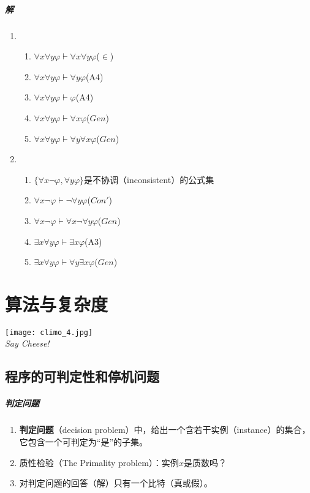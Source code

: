 \documentclass[b5paper,oneside]{ctexbook}
\begin{document}
\paragraph{解}
\begin{enumerate}
\item \begin{enumerate}
\item $\forall x\forall y\varphi\vdash\forall x\forall y\varphi$\hfill ($\in$)
\item $\forall x\forall y\varphi\vdash\forall y\varphi$\hfill (A4)
\item $\forall x\forall y\varphi\vdash\varphi$\hfill (A4)
\item $\forall x\forall y\varphi\vdash\forall x\varphi$\hfill ($Gen$)
\item $\forall x\forall y\varphi\vdash\forall y\forall x\varphi$\hfill ($Gen$)
\end{enumerate}
\item \begin{enumerate}
\item $\{\forall x\neg\varphi,\forall y\varphi\}$是不协调（inconsistent）的公式集
\item $\forall x\neg\varphi\vdash\neg\forall y\varphi$\hfill ($Con'$)
\item $\forall x\neg\varphi\vdash\forall x\neg\forall y\varphi$\hfill ($Gen$)
\item $\exists x\forall y\varphi\vdash\exists x\varphi$\hfill (A3)
\item $\exists x\forall y\varphi\vdash\forall y\exists x\varphi$\hfill ($Gen$)
\end{enumerate}
\end{enumerate}
\chapter{算法与复杂度}
\vspace*{\fill}
\begin{center}
\texttt{[image: climo\_4.jpg]}
\\\emph{Say Cheese!}
\end{center}
\vspace*{\fill}
\clearpage
\section{程序的可判定性和停机问题}
\paragraph{判定问题}
\begin{enumerate}
  \item \textbf{判定问题}（decision problem）中，给出一个含若干实例（instance）的集合，它包含一个可判定为“是”的子集。
  \item 质性检验（The Primality problem）：实例$x$是质数吗？
  \item 对判定问题的回答（解）只有一个比特（真或假）。
\end{enumerate}
\end{document}
